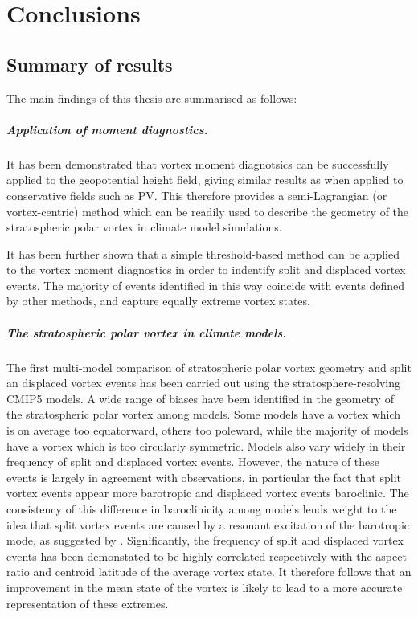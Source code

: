\chapter{Conclusions}
\label{cha:conclusions}

\section{Summary of results}

The main findings of this thesis are summarised as follows: 

\paragraph{Application of moment diagnostics.} It has been demonstrated that
vortex moment diagnotsics can be successfully applied to the geopotential height
field, giving similar results as when applied to conservative fields such as
PV. This therefore provides a semi-Lagrangian (or vortex-centric) method which
can be readily used to describe the geometry of the stratospheric polar vortex
in climate model simulations.

It has been further shown that a simple threshold-based method can be applied to
the vortex moment diagnostics in order to indentify split and displaced vortex
events. The majority of events identified in this way coincide with events
defined by other methods, and capture equally extreme vortex states.

\paragraph{The stratospheric polar vortex in climate models.} The first
multi-model comparison of stratospheric polar vortex geometry and split an
displaced vortex events has been carried out using the stratosphere-resolving
CMIP5 models. A wide range of biases have been identified in the geometry of the
stratospheric polar vortex among models. Some models have a vortex which is on
average too equatorward, others too poleward, while the majority of models have
a vortex which is too circularly symmetric. Models also vary widely in their
frequency of split and displaced vortex events. However, the nature of these
events is largely in agreement with observations, in particular the fact that
split vortex events appear more barotropic and displaced vortex events
baroclinic. The consistency of this difference in baroclinicity among models
lends weight to the idea that split vortex events are caused by a resonant
excitation of the barotropic mode, as suggested by
\citet{Esler2005}. Significantly, the frequency of split and displaced vortex
events has been demonstated to be highly correlated respectively with the aspect
ratio and centroid latitude of the average vortex state. It therefore follows
that an improvement in the mean state of the vortex is likely to lead to a more
accurate representation of these extremes.

